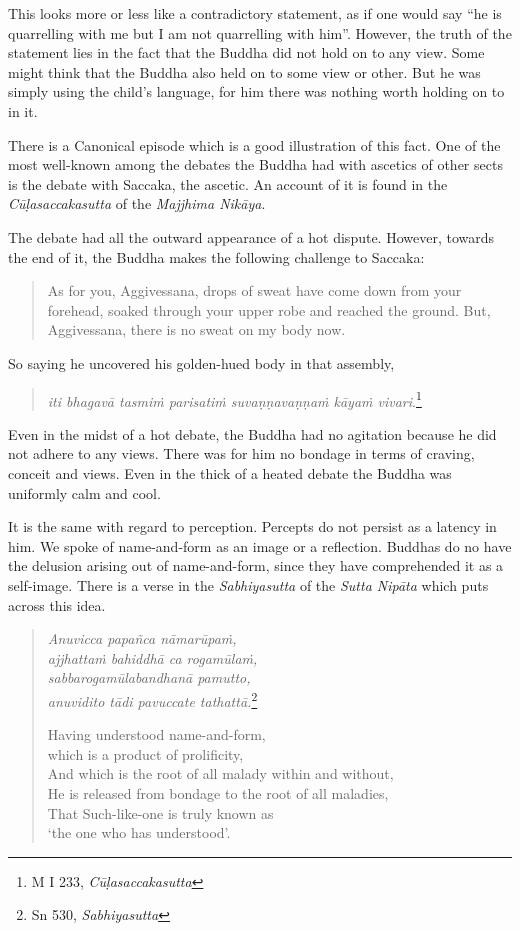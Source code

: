 This looks more or less like a contradictory statement, as if one would say ``he is quarrelling with me but I am not quarrelling with him''. However, the truth of the statement lies in the fact that the Buddha did not hold on to any view. Some might think that the Buddha also held on to some view or other. But he was simply using the child's language, for him there was nothing worth holding on to in it.

There is a Canonical episode which is a good illustration of this fact. One of the most well-known among the debates the Buddha had with ascetics of other sects is the debate with Saccaka, the ascetic. An account of it is found in the \emph{Cūḷasaccakasutta} of the \emph{Majjhima Nikāya}.

The debate had all the outward appearance of a hot dispute. However, towards the end of it, the Buddha makes the following challenge to Saccaka:

\begin{quote}
As for you, Aggivessana, drops of sweat have come down from your forehead, soaked through your upper robe and reached the ground. But, Aggivessana, there is no sweat on my body now.
\end{quote}

So saying he uncovered his golden-hued body in that assembly,

\begin{quote}
\emph{iti bhagavā tasmiṁ parisatiṁ suvaṇṇavaṇṇaṁ kāyaṁ vivari}.\footnote{M I 233, \emph{Cūḷasaccakasutta}}
\end{quote}

Even in the midst of a hot debate, the Buddha had no agitation because he did not adhere to any views. There was for him no bondage in terms of craving, conceit and views. Even in the thick of a heated debate the Buddha was uniformly calm and cool.

It is the same with regard to perception. Percepts do not persist as a latency in him. We spoke of name-and-form as an image or a reflection. Buddhas do no have the delusion arising out of name-and-form, since they have comprehended it as a self-image. There is a verse in the \emph{Sabhiyasutta} of the \emph{Sutta Nipāta} which puts across this idea.

\begin{quote}
\emph{Anuvicca papañca nāmarūpaṁ,}\\
\emph{ajjhattaṁ bahiddhā ca rogamūlaṁ,}\\
\emph{sabbarogamūlabandhanā pamutto,}\\
\emph{anuvidito tādi pavuccate tathattā.}\footnote{Sn 530, \emph{Sabhiyasutta}}

Having understood name-and-form,\\
\vin which is a product of prolificity,\\
And which is the root of all malady within and without,\\
He is released from bondage to the root of all maladies,\\
That Such-like-one is truly known as\\
\vin `the one who has understood'.
\end{quote}

